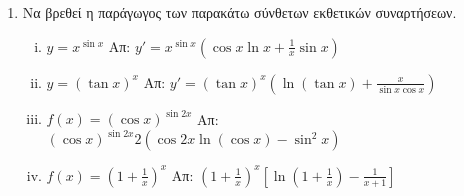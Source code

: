 \documentclass[a4paper,12pt]{article}
\begin{document}
\begin{enumerate}
\item Να βρεθεί η παράγωγος των παρακάτω σύνθετων εκθετικών συναρτήσεων.
	\begin{enumerate}[i)]
		\item $y = x^{\sin{x}} $ \hfill Απ: $ y' = x^{\sin{x}}\left(\cos{x} \ln{x} + \frac{1}{x} \sin{x} \right) $
		\item $ y= (\tan{x})^{x} $ \hfill Απ: $ y' = \left(\tan{x}\right)^{x} \left(\ln{(\tan{x})} +
			\frac{x}{\sin{x} \cos{x}}\right) $
					\item $ f(x) = (\cos{x})^{\sin{2x}} $ \hfill Απ: $
			(\cos{x})^{\sin{2x}} 2(\cos{2x} \ln{(\cos{x})} - \sin^{2}{x}) $
			\item $ f(x) = \left(1 + \frac{1}{x} \right)^{x} $ \hfill Απ: $
				\left(1 + \frac{1}{x}\right)^{x}\left[\ln{(1 + \frac{1}{x})} -
				\frac{1}{x+1}\right] $
	\end{enumerate}
\end{enumerate}
\end{document}
